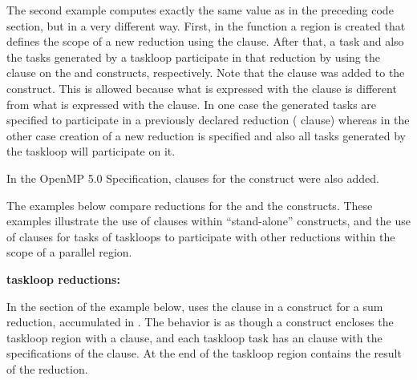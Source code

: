 The second example computes exactly the same value as in the preceding  code section,
but in a very different way.
First, in the  function a  region is created 
that defines the scope of a new reduction using the  clause.
After that, a task and also the tasks generated by a taskloop participate in 
that reduction by using the  clause on the 
and  constructs, respectively. 
Note that the  clause was added to the  construct.
This is allowed because what is expressed with the  clause
is different from what is expressed with the  clause.
In one case the generated tasks are specified to participate in a previously 
declared reduction ( clause) whereas in the other case
creation of a new reduction is specified and also all tasks generated 
by the taskloop will participate on it.


In the OpenMP 5.0 Specification,  clauses for the
 construct were also added. 

The examples below compare reductions for the  and the  constructs.
These examples illustrate the use of  clauses within 
``stand-alone''  constructs, and the use of  clauses for tasks of taskloops to participate
with other reductions within the scope of a parallel region.

\textbf{taskloop reductions:}

In the  section of the example below, 
 uses the  clause 
in a  construct for a sum reduction, accumulated in . 
The behavior is as though a  construct encloses the 
taskloop region with a  clause, and each taskloop
task has an  clause with the specifications 
of the  clause.
At the end of the taskloop region  contains the result of the reduction.

